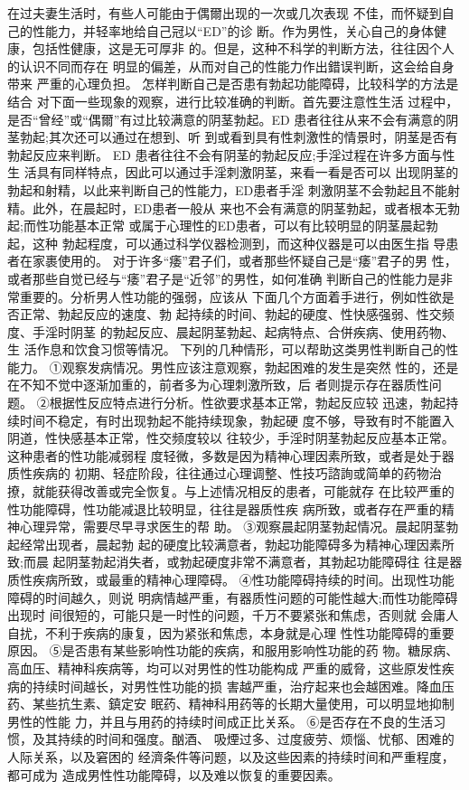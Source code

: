 \documentclass[12pt,UTF8]{ctexbook}
\begin{document}
在过夫妻生活时，有些人可能由于偶爾出现的一次或几次表现
不佳，而怀疑到自己的性能力，并轻率地给自己冠以“ED”的诊
断。作为男性，关心自己的身体健康，包括性健康，这是无可厚非
的。但是，这种不科学的判断方法，往往因个人的认识不同而存在
明显的偏差，从而对自己的性能力作出錯误判断，这会给自身带来
严重的心理负担。
怎样判断自己是否患有勃起功能障碍，比较科学的方法是结合
对下面一些现象的观察，进行比较准确的判断。首先要注意性生活
过程中，是否“曾经”或“偶爾”有过比较满意的阴茎勃起。ED
患者往往从来不会有满意的阴茎勃起;其次还可以通过在想到、听
到或看到具有性刺激性的情景时，阴茎是否有勃起反应来判断。
ED 患者往往不会有阴茎的勃起反应;手淫过程在许多方面与性生
活具有同样特点，因此可以通过手淫刺激阴茎，来看一看是否可以
出现阴茎的勃起和射精，以此来判断自己的性能力，ED患者手淫
刺激阴茎不会勃起且不能射精。此外，在晨起时，ED患者一般从
来也不会有满意的阴茎勃起，或者根本无勃起;而性功能基本正常
或属于心理性的ED患者，可以有比较明显的阴茎晨起勃起，这种
勃起程度，可以通过科学仪器检测到，而这种仪器是可以由医生指
导患者在家裹使用的。
对于许多“痿”君子们，或者那些怀疑自己是“痿”君子的男
性，或者那些自觉已经与“痿”君子是“近邻”的男性，如何准确
判断自己的性能力是非常重要的。分析男人性功能的强弱，应该从
下面几个方面着手进行，例如性欲是否正常、勃起反应的速度、勃
起持续的时间、勃起的硬度、性快感强弱、性交频度、手淫时阴茎
的勃起反应、晨起阴茎勃起、起病特点、合併疾病、使用药物、生
活作息和饮食习惯等情况。
下列的几种情形，可以帮助这类男性判断自己的性能力。
①观察发病情况。男性应该注意观察，勃起困难的发生是突然
性的，还是在不知不觉中逐渐加重的，前者多为心理刺激所致，后
者则提示存在器质性问题。
②根据性反应特点进行分析。性欲要求基本正常，勃起反应较
迅速，勃起持续时间不稳定，有时出现勃起不能持续现象，勃起硬
度不够，导致有时不能置入阴道，性快感基本正常，性交频度较以
往较少，手淫时阴茎勃起反应基本正常。这种患者的性功能减弱程
度轻微，多数是因为精神心理因素所致，或者是处于器质性疾病的
初期、轻症阶段，往往通过心理调整、性技巧諮詢或简单的药物治
撩，就能获得改善或完全恢复。与上述情况相反的患者，可能就存
在比较严重的性功能障碍，性功能减退比较明显，往往是器质性疾
病所致，或者存在严重的精神心理异常，需要尽早寻求医生的帮
助。
③观察晨起阴茎勃起情况。晨起阴茎勃起经常出现者，晨起勃
起的硬度比较满意者，勃起功能障碍多为精神心理因素所致;而晨
起阴茎勃起消失者，或勃起硬度非常不满意者，其勃起功能障碍往
往是器质性疾病所致，或最重的精神心理障碍。
④性功能障碍持续的时间。出现性功能障碍的时间越久，则说
明病情越严重，有器质性问题的可能性越大;而性功能障碍出现时
间很短的，可能只是一时性的问题，千万不要紧张和焦虑，否则就
会庸人自扰，不利于疾病的康复，因为紧张和焦虑，本身就是心理
性性功能障碍的重要原因。
⑤是否患有某些影响性功能的疾病，和服用影响性功能的药
物。糖尿病、高血压、精神科疾病等，均可以对男性的性功能构成
严重的威脅，这些原发性疾病的持续时间越长，对男性性功能的损
害越严重，治疗起来也会越困难。降血压药、某些抗生素、鎮定安
眠药、精神科用药等的长期大量使用，可以明显地抑制男性的性能
力，并且与用药的持续时间成正比关系。
⑥是否存在不良的生活习惯，及其持续的时间和强度。酗酒、
吸煙过多、过度疲劳、烦惱、忧郁、困难的人际关系，以及窘困的
经濟条件等问题，以及这些因素的持续时间和严重程度，都可成为
造成男性性功能障碍，以及难以恢复的重要因素。
\end{document}
